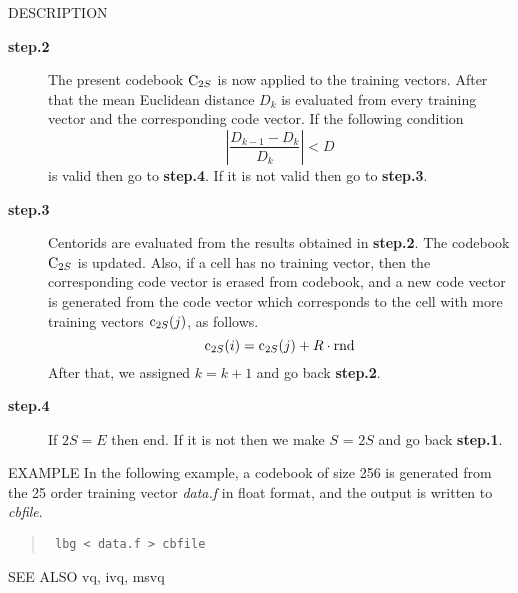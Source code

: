 \begin{qsection}{DESCRIPTION}
\begin{description}
\item[\bf step.2~~~]
The present codebook $\mbox{\boldmath C}_{2S}$ is now applied
to the training vectors.
After that the mean Euclidean distance $D_k$ is evaluated
from every training vector and the corresponding code vector.
If the following condition 
\begin{displaymath}
|\frac{D_{k-1}-D_{k}}{D_{k}}| < D
\end{displaymath}
is valid then go to {\bf step.4}.
If it is not valid then go to {\bf step.3}.

\item[\bf step.3~~~]
Centorids are evaluated from the results obtained in {\bf step.2}.
The codebook $\mbox{\boldmath C}_{2S}$ is updated.
Also, if a cell has no training vector, then the corresponding
code vector is erased from codebook,
and a new code vector is generated from the code vector
which corresponds to the cell with more training vectors 
$\mbox{\boldmath c}_{2S}(j)$, as follows.
\begin{displaymath}
\mbox{\boldmath c}_{2S}(i)=\mbox{\boldmath c}_{2S}(j) + R \cdot \mbox{\boldmath rnd}
\end{displaymath}
After that, we assigned $k=k+1$ and go back {\bf step.2}.

\item[\bf step.4~~~]
If $2S = E$ then end.
If it is not then we make $S$ = $2S$ and go back {\bf step.1}.

\end{description}
\end{qsection}

\begin{options}
\end{options}

\begin{qsection}{EXAMPLE}
In the following example, a codebook of size 256 is generated from
the 25 order training vector {\em data.f} in float format,
and the output is written to {\em cbfile}.
\begin{quote}
\verb! lbg < data.f > cbfile!
\end{quote}
\end{qsection}

\begin{qsection}{SEE ALSO}
vq, ivq, msvq
\end{qsection}
